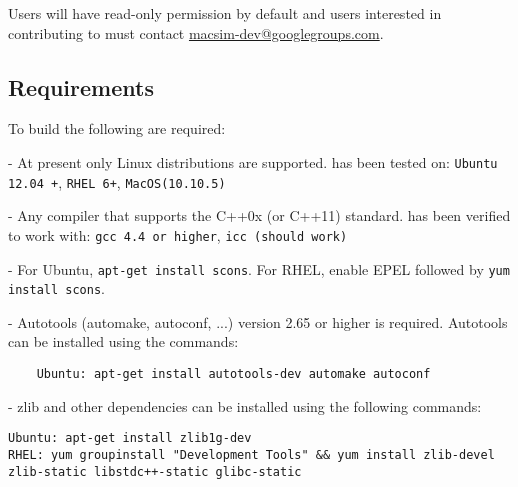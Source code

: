 Users will have read-only permission by default and users interested
in contributing to \SIM must contact
\href{mailto:macsim-dev@googlegroups.com}{macsim-dev@googlegroups.com}.



\subsection{Requirements}

To build \SIM the following are required:

\begingroup
\renewcommand\descriptionlabel[1]{\textit{\hspace\labelsep{#1}}}
\begin{description}\firmlist
  \item[Operating System]- At present only Linux distributions are supported. \SIM has been tested on:
   \Verb!Ubuntu 12.04 +!, \Verb!RHEL 6+!, \Verb+MacOS(10.10.5)+
  \item[Compiler]- Any compiler that supports the C++0x (or C++11)
    standard. \SIM has been verified to work with: \Verb+gcc 4.4 or higher+, \Verb+icc (should work)+
  \item[SConstruct]- For Ubuntu, \Verb+apt-get install scons+. For RHEL, enable EPEL followed by \Verb+yum install scons+. 

\ignore
	 {
	  \item[Autotools] - Autotools (automake, autoconf,
		...) version 2.65 or higher is required. Autotools can be installed using the commands:
	\begin{Verbatim}
	Ubuntu: apt-get install autotools-dev automake autoconf
	\end{Verbatim}
	}
  
  \item[Libraries]- zlib and other dependencies can be installed using the following commands:
\begin{Verbatim}
Ubuntu: apt-get install zlib1g-dev
RHEL: yum groupinstall "Development Tools" && yum install zlib-devel zlib-static libstdc++-static glibc-static 
\end{Verbatim}
\end{description}
\endgroup




